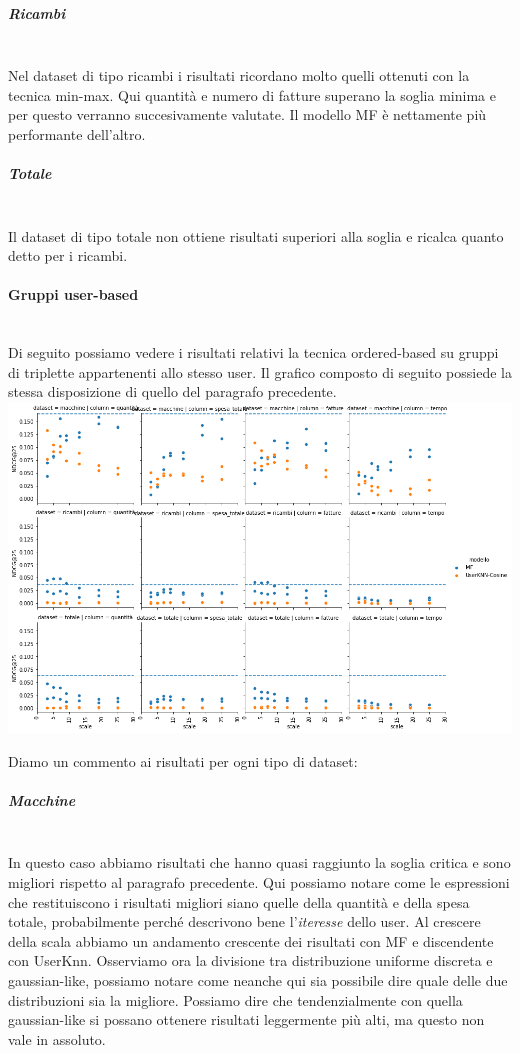 \subparagraph{Ricambi}\mbox{} \\
Nel dataset di tipo ricambi i risultati ricordano molto quelli ottenuti con la tecnica min-max. Qui quantità e numero di fatture superano la soglia minima e per questo verranno succesivamente valutate. Il modello MF è nettamente più performante dell'altro.

\subparagraph{Totale}\mbox{} \\
Il dataset di tipo totale non ottiene risultati superiori alla soglia e ricalca quanto detto per i ricambi.

\paragraph{Gruppi user-based}\mbox{} \\
Di seguito possiamo vedere i risultati relativi la tecnica ordered-based su gruppi di triplette appartenenti allo stesso user.
Il grafico composto di seguito possiede la stessa disposizione di quello del paragrafo precedente.\\

\includegraphics[width=16cm]{figures/risultati_ordered_singolo.png}

Diamo un commento ai risultati per ogni tipo di dataset:\\
\subparagraph{Macchine}\mbox{} \\
In questo caso abbiamo risultati che hanno quasi raggiunto la soglia critica e sono migliori rispetto al paragrafo precedente. Qui possiamo notare come le espressioni che restituiscono i risultati migliori siano quelle della quantità e della spesa totale, probabilmente perché descrivono bene l'\textit{iteresse} dello user. Al crescere della scala abbiamo un andamento crescente dei risultati con MF e discendente con UserKnn. Osserviamo ora la divisione tra distribuzione uniforme discreta e gaussian-like, possiamo notare come neanche qui sia possibile dire quale delle due distribuzioni sia la migliore. 
Possiamo dire che tendenzialmente con quella gaussian-like si possano ottenere risultati leggermente più alti, ma questo non vale in assoluto.

